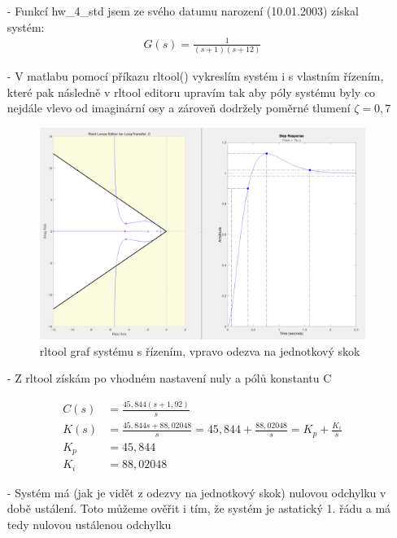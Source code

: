 \documentclass{article}
\begin{document}
\begin{itemize}
    \item[-] Funkcí hw\_4\_std jsem ze svého datumu narození (10.01.2003) získal systém:
    \begin{align*}
        G(s) = \frac{1}{(s+1)(s+12)}
    \end{align*}
    \item[-] V matlabu pomocí příkazu rltool() vykreslím systém i s vlastním řízením, které pak následně v rltool editoru upravím tak aby póly systému byly co nejdále vlevo od imaginární osy a zároveň dodržely poměrné tlumení $\zeta = 0,7$
    \begin{figure}[H]
        \centering
        \includegraphics[clip, width=1.00\textwidth]{plot.png}
        \caption{rltool graf systému s řízením, vpravo odezva na jednotkový skok}
        \label{fig:plot 2}
    \end{figure}

    \item[-] Z rltool získám po vhodném nastavení nuly a pólů konstantu C

    \begin{align*}
        C(s) &= \frac{45,844(s+1,92)}{s}\\
        K(s) &= \frac{45,844s+88,02048}{s} = 45,844+\frac{88,02048}{s} = K_p + \frac{K_i}{s}\\
        K_p &= 45,844\\ 
        K_i &= 88,02048
    \end{align*}

    \item[-] Systém má (jak je vidět z odezvy na jednotkový skok) nulovou odchylku v době ustálení. Toto můžeme ověřit i tím, že systém je astatický 1. řádu a má tedy nulovou ustálenou odchylku
    
\end{itemize}
\end{document}
